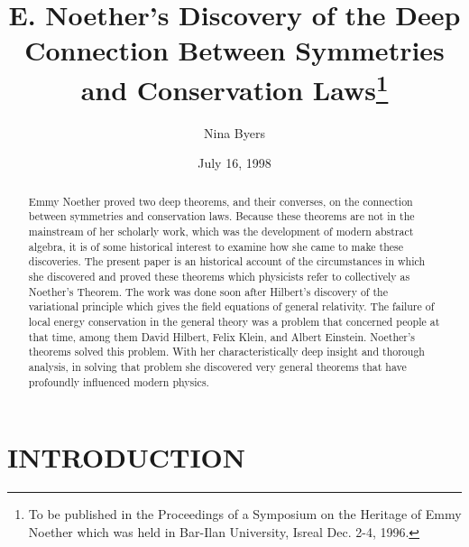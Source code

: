 

\draft
\title{E. Noether's Discovery of the Deep Connection Between
Symmetries and
                   Conservation Laws\footnote{To be published in
the Proceedings of a
Symposium on the Heritage of Emmy Noether which was held in 
Bar-Ilan University, Isreal Dec. 2-4,
1996.}}


\author{Nina Byers} \address{Physics
Department, UCLA, Los Angeles, CA 90024} \date{July 16, 1998}
 \maketitle

\begin{abstract} 
Emmy Noether proved two deep theorems, and their converses, on
 the connection between symmetries and conservation laws. Because these
 theorems are not in the mainstream of her scholarly work, 
  which was the development of modern
 abstract algebra,  it is of some historical interest to examine how
 she came to make these discoveries.  The present paper is an historical account of the
 circumstances in which she  discovered and proved  these theorems which
 physicists refer to collectively as Noether's Theorem.  The work was done 
 soon after  Hilbert's discovery of the variational principle which
 gives the field equations of general relativity.  The failure of local energy
 conservation in the general theory was a problem that concerned people at that
 time, among them David Hilbert, Felix Klein, and Albert Einstein.  Noether's
 theorems solved this problem.  With her characteristically deep insight and
 thorough analysis, in solving that problem she discovered very general theorems
 that have profoundly influenced modern physics. 
 \end{abstract}





\section{INTRODUCTION} 


